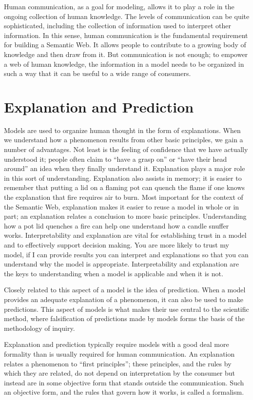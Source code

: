 Human communication, as a goal for modeling, allows it to play a role in
the ongoing collection of human knowledge. The levels of communication
can be quite sophisticated, including the collection of information used
to interpret other information. In this sense, human communication is
the fundamental requirement for building a Semantic Web. It allows
people to contribute to a growing body of knowledge and then draw from
it. But communication is not enough; to empower a web of human
knowledge, the information in a model needs to be organized in such a
way that it can be useful to a wide range of consumers.

\section{Explanation and Prediction}

Models are used to organize human thought in the form of explanations.
When we understand how a phenomenon results from other basic principles,
we gain a number of advantages. Not least is the feeling of confidence
that we have actually understood it; people often claim to ``have a
grasp on'' or ``have their head around'' an idea when they finally
understand it. Explanation plays a major role in this sort of
understanding. Explanation also assists in memory; it is easier to
remember that putting a lid on a flaming pot can quench the flame if one
knows the explanation that fire requires air to burn. Most important for
the context of the Semantic Web, explanation makes it easier to reuse a
model in whole or in part; an explanation relates a conclusion to more
basic principles. Understanding how a pot lid quenches a fire can help
one understand how a candle snuffer works. Interpretability and
explanation are vital for establishing trust in a model and to
effectively support decision making. You are more likely to trust my
model, if I can provide results you can interpret and explanations so
that you can understand why the model is appropriate. Interpretability
and explanation are the keys to understanding when a model is applicable
and when it is not.

Closely related to this aspect of a model is the idea of prediction.
When a model provides an adequate explanation of a phenomenon, it can
also be used to make predictions. This aspect of models is what makes
their use central to the scientific method, where falsification of
predictions made by models forms the basis of the methodology of
inquiry.

Explanation and prediction typically require models with a good deal
more formality than is usually required for human communication. An
explanation relates a phenomenon to ``first principles''; these
principles, and the rules by which they are related, do not depend on
interpretation by the consumer but instead are in some objective form
that stands outside the communication. Such an objective form, and the
rules that govern how it works, is called a formalism.

